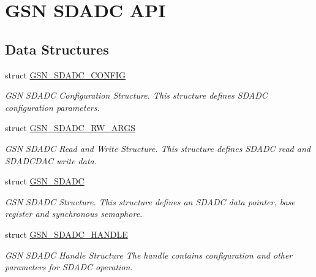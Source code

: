 \hypertarget{a00652}{
\section{GSN SDADC API}
\label{a00652}
}
\subsection*{Data Structures}
\begin{DoxyCompactItemize}
\item 
struct \hyperlink{a00213}{GSN\_\-SDADC\_\-CONFIG}
\begin{DoxyCompactList}\small\item\em GSN SDADC Configuration Structure. This structure defines SDADC configuration parameters. \end{DoxyCompactList}\item 
struct \hyperlink{a00215}{GSN\_\-SDADC\_\-RW\_\-ARGS}
\begin{DoxyCompactList}\small\item\em GSN SDADC Read and Write Structure. This structure defines SDADC read and SDADCDAC write data. \end{DoxyCompactList}\item 
struct \hyperlink{a00212}{GSN\_\-SDADC}
\begin{DoxyCompactList}\small\item\em GSN SDADC Structure. This structure defines an SDADC data pointer, base register and synchronous semaphore. \end{DoxyCompactList}\item 
struct \hyperlink{a00214}{GSN\_\-SDADC\_\-HANDLE}
\begin{DoxyCompactList}\small\item\em GSN SDADC Handle Structure The handle contains configuration and other parameters for SDADC operation. \end{DoxyCompactList}\end{DoxyCompactItemize}

